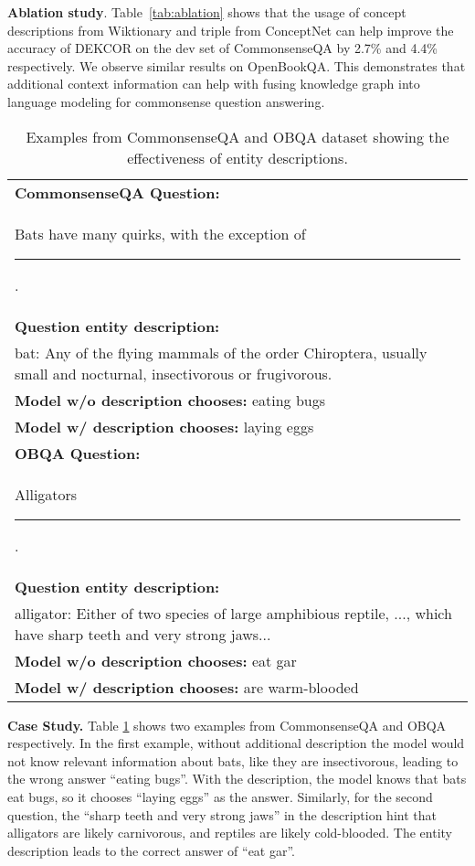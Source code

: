 \documentclass[11pt,a4paper]{article}
\begin{document}
\noindent\textbf{Ablation study}. Table~\ref{tab:ablation} shows that the usage of concept descriptions from Wiktionary and triple from ConceptNet can help improve the accuracy of DEKCOR on the dev set of CommonsenseQA by 2.7\% and 4.4\% respectively. We observe similar results on OpenBookQA. This demonstrates that additional context information can help with fusing knowledge graph into language modeling for commonsense question answering.
\begin{table}[t]
\renewcommand{\arraystretch}{1.1}
\begin{small}
\begin{tabular}{p{7.5cm}}
\hline
\textbf{CommonsenseQA Question:} \\
Bats have many quirks, with the exception of \rule{0.5cm}{0.15mm} . \\
\textbf{Question entity description:} \\
bat: Any of the flying mammals of the order Chiroptera, usually small and nocturnal, insectivorous or frugivorous.
\\ \hline
\textbf{Model w/o description chooses:} eating bugs\\
    \textbf{Model w/ description chooses:} laying eggs\\\hhline{=}
\textbf{OBQA Question:}\\                                                 
Alligators  \rule{0.5cm}{0.15mm} . \\
\textbf{Question entity description:} \\
alligator: Either of two species of large amphibious reptile, ..., which have sharp teeth and very strong jaws...
\\ \hline
\textbf{Model w/o description chooses:} eat gar\\
    \textbf{Model w/ description chooses:} are warm-blooded\\
\hline
\end{tabular}
\end{small}
\caption{Examples from CommonsenseQA and OBQA dataset showing the effectiveness of entity descriptions. }\label{tab:examples}
\end{table}


\noindent\textbf{Case Study.} Table \ref{tab:examples} shows two examples from CommonsenseQA and OBQA respectively. In the first example, without additional description the model would not know relevant information about bats, like they are insectivorous, leading to the wrong answer ``eating bugs''. With the description, the model knows that bats eat bugs, so it chooses ``laying eggs'' as the answer. Similarly, for the second question, the ``sharp teeth and very strong jaws'' in the description hint that alligators are likely carnivorous, and reptiles are likely cold-blooded. The entity description leads to the correct answer of ``eat gar''.
\end{document}
